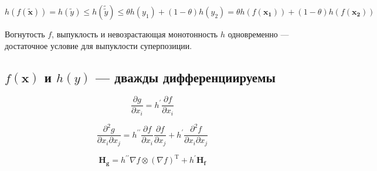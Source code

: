 	\begin{equation}
	h(f(\mathbf{\tilde{x}})) =h( \tilde{y}) \leqslant h(\tilde{\tilde{y}})
	\leqslant \theta h(y_1) + (1 - \theta) h(y_2) = \theta h(f(\mathbf{x_1})) + (1 -
	\theta) h(f(\mathbf{x_2}))
	\end{equation}
	
	Вогнутость $f$, выпуклость и невозрастающая монотонность $h$ одновременно ---
	достаточное условие для выпуклости суперпозиции.
	
	\subsection{$f(\mathbf{x})$ и $h(y)$ --- дважды дифференциируемы}
	
	\begin{equation}
	\frac{\partial g}{\partial x_i} = h^{\prime} \frac{\partial f}{\partial x_i}
	\end{equation}
	
	\begin{equation}
	\frac{\partial^2 g}{\partial x_i \partial x_j} = h^{\prime\prime} \frac{\partial f}{\partial x_i}\frac{\partial f}{\partial x_j} + h^{\prime} \frac{\partial^2 f}{\partial x_i\partial x_j}
	\end{equation}
	
	\begin{equation}
	\mathbf{H_g} = h^{\prime\prime} \nabla f \otimes (\nabla f)^\text{T} + h^{\prime} \mathbf{H_f}
	\end{equation}
	
	


